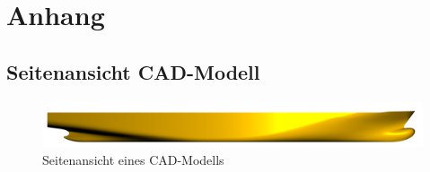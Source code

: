 \chapter{Anhang}
\section{Seitenansicht CAD-Modell}\label{app:cad}
\begin{figure}[h!]
\centering
  \includegraphics[width=\textwidth]{./figures/schiff.png}
  \caption{Seitenansicht eines CAD-Modells}
\end{figure}
\newpage

